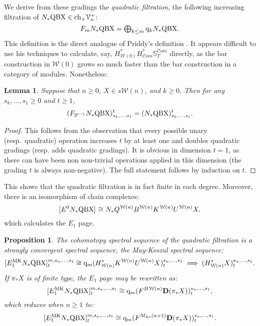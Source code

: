 \documentclass[11pt]{amsart} \renewcommand{\baselinestretch}{1.4}
\theoremstyle{plain}
\newtheorem{lem}[thm]{Lemma}
\newtheorem{prop}[thm]{Proposition}
\theoremstyle{definition}
\newcommand{\scrC}{\mathscr{C}}
\newcommand{\calV}{\mathcal{V}}
\newcommand{\calw}{\mathcal{W}}
\newcommand{\calMhv}{\mathcal{M}_\mathrm{hv}}
\newcommand{\vect}[2]{\calV^{#1}_{#2}}
\newcommand{\HA}[1]{H#1}
\newcommand{\quadgrad}[1]{\mathrm{q}_{#1}}
\newcommand{\complexes}{\mathrm{ch}_+}
\newcommand{\algs}{{\scrC\!\textit{om}}}
\newcommand{\E}[5]{[E^{#1}_{#2}#3]^{#4}_{#5}}
\newcommand{\dual}{\mathbf{D}}
\begin{document}
\begin{May sseq and vanishing line}
We derive from these gradings the \emph{quadratic filtration}, the following increasing filtration of $N_*\textup{QBX}\in \complexes \vect{+}{n}$:
\[F_mN_*\textup{QBX}=\textstyle\bigoplus_{k\leq m} \quadgrad{k}N_*\textup{QBX}. \]
This definition is the direct analogue of Priddy's definition \cite{PriddyKoszul.pdf}. It appears difficult to use his techniques to calculate, say, $H^*_{\calw(0)}H^*_\algs\mathbb{S}^{\algs}_T$ directly, as the bar construction in $\calw(0)$ grows so much faster than the bar construction in a category of modules. Nonetheless:
\begin{lem}
Suppose that $n\geq0$, $X\in s\calw(n)$, and $k\geq0$. Then for any $s_k,\ldots,s_1\geq0$ and $t\geq1$,
\[(F_{2^{t-1}}N_*\textup{QBX})_{{s_k,\ldots,s_1}}^t=(N_*\textup{QBX})_{{s_k,\ldots,s_1}}^t.\]
\end{lem}
\begin{proof}
This follows from the observation that every possible unary (resp.\ quadratic) operation increases $t$ by at least one and doubles quadratic gradings (resp. adds quadratic gradings). It is obvious in dimension $t=1$, as there can have been non non-trivial operations applied in this dimension (the grading $t$ is always non-negative). The full statement follows by induction on $t$.
%
%
\end{proof}
This shows that the quadratic filtration is in fact finite in each degree.
Moreover, there is an isomorphism of chain complexes:
\[\E{0}{}{N_*\textup{QBX}}{}{}\cong N_*Q^{\calw(n)}B^{\calw(n)}K^{\calw(n)}U^{\calw(n)}X,\]
which calculates the $E_1$ page.
\begin{prop}
The cohomotopy spectral sequence of the quadratic filtration is a strongly convergent spectral sequence, the \emph{May-Koszul} spectral sequence:
\[\E{\textup{MK}}{1}{N_*\textup{QBX}}{m,s_n,\ldots,s_1}{t}\cong \quadgrad{m}(H^*_{\calw(n)}K^{\calw(n)}U^{\calw(n)}X)^{s_n,\ldots,s_1}_{t}\implies (H^*_{\calw(n)}X)^{s_n,\ldots,s_1}_{t}.\]
If $\pi_*X$ is of finite type, the $E_1$ page may be rewritten as:
\[\E{\textup{MK}}{1}{N_*\textup{QBX}}{m,s_n,\ldots,s_1}{t}\cong \quadgrad{m}(F^{\HA{\calw(n)}}\dual(\pi_*X))^{s_n,\ldots,s_1}_{t},\]
which reduces when $n\geq1$ to:
\[\E{\textup{MK}}{1}{N_*\textup{QBX}}{m,s_n,\ldots,s_1}{t}\cong \quadgrad{m}(F^{\calMhv(n+1)}\dual(\pi_*X))^{s_n,\ldots,s_1}_{t}.\]
\end{prop}


\end{May sseq and vanishing line}
\end{document}
